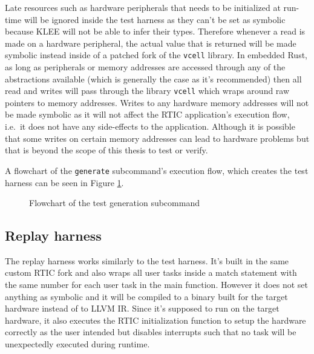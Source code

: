 

Late resources such as hardware peripherals that needs to be initialized at
run-time will be ignored inside the test harness as they can't be set as
symbolic because KLEE will not be able to infer their types. Therefore whenever
a read is made on a hardware peripheral, the actual value that is returned will
be made symbolic instead inside of a patched fork of the \texttt{vcell}
library. In embedded Rust, as long as peripherals or memory addresses are
accessed through any of the abstractions available (which is generally the case
as it's recommended) then all read and writes will pass through the library
\texttt{vcell} which wraps around raw pointers to memory addresses. Writes to
any hardware memory addresses will not be made symbolic as it will not affect
the RTIC application's execution flow, i.e.\ it does not have any side-effects
to the application. Although it is possible that some writes on certain memory
addresses can lead to hardware problems but that is beyond the scope of this
thesis to test or verify.

A flowchart of the \texttt{generate} subcommand's execution flow, which creates
the test harness can be seen in Figure \ref{fig:generatecmd}.
\begin{figure}[H]
    \centering
    \caption{Flowchart of the test generation subcommand}
    \label{fig:generatecmd}
\end{figure}

\subsection{Replay harness}
The replay harness works similarly to the test harness. It's built in the same
custom RTIC fork and also wraps all user tasks inside a match statement with
the same number for each user task in the main function. However it does not
set anything as symbolic and it will be compiled to a binary built for the
target hardware instead of to LLVM IR. Since it's supposed to run on the target
hardware, it also executes the RTIC initialization function to setup the
hardware correctly as the user intended but disables interrupts such that no
task will be unexpectedly executed during runtime.

